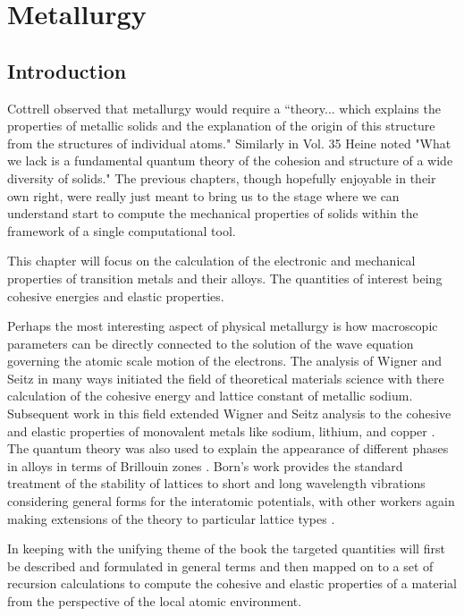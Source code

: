 \chapter{Metallurgy}
\label{chap:metallurgy}
\section{Introduction}
Cottrell observed that metallurgy would require a ``theory... which explains
the properties of metallic solids and the explanation of the origin of this
structure from the structures of individual atoms." Similarly in Vol. 35
Heine noted "What we lack is a fundamental quantum theory of the cohesion
and structure of a wide diversity of solids." The previous chapters,
though hopefully enjoyable in their own right, were really just meant to bring
us to the stage where we can understand start to compute 
the mechanical properties of solids within the framework 
of a single computational tool.

This chapter will focus on the calculation of the electronic and mechanical
properties of transition metals and their alloys. The quantities of interest
being cohesive energies and elastic properties.

Perhaps the most interesting aspect of physical metallurgy is how
macroscopic parameters can be directly connected to the solution of 
the wave equation governing the atomic scale motion of the electrons.
The analysis of Wigner and Seitz in many ways initiated the field
of theoretical materials science with there calculation of the cohesive
energy and lattice constant of metallic sodium\cite{wigner33, wigner34}.
Subsequent work in this field extended Wigner and Seitz analysis
to the cohesive and elastic properties of monovalent
metals like sodium, lithium, and copper \cite{fuchs36}. The quantum theory was
also used to explain the appearance of different phases in alloys in terms 
of Brillouin zones \cite{owen33, jones34}. Born's work provides the standard
treatment of the stability of lattices to short and long wavelength
vibrations considering general forms for the interatomic potentials\cite{born40,born42},
with other workers again making extensions of the theory to particular
lattice types \cite{power41, nabarro52}.

In keeping with the unifying theme of the book the targeted quantities
will first be described and formulated in general terms and then mapped
on to a set of recursion calculations to compute the cohesive and elastic
properties of a material from the perspective of the local atomic environment.


